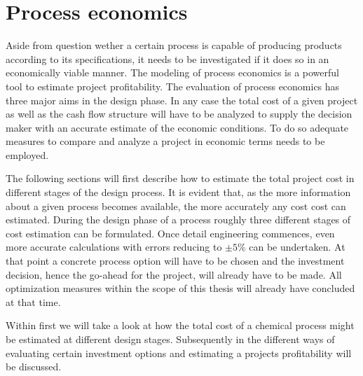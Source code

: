 \chapter{Process economics}
\label{chp:ProcesEconomics}

Aside from question wether a certain process is capable of producing products according to its
specifications, it needs to be investigated if it does so in an economically viable manner. The modeling
of process economics is a powerful tool to estimate project profitability. The evaluation of process
economics has three major aims in the design phase.
%
In any case the total cost of a given project as well as the cash flow structure will have to be analyzed to supply
the decision maker with an accurate estimate of the economic conditions. To do so adequate measures to compare and
analyze a project in economic terms needs to be employed.

The following sections will first describe how to estimate the total project cost in different stages of the
design process. It is evident that, as the more information about a given process becomes available, the
more accurately any cost cost can estimated. During the design phase of a process roughly three
different stages of cost estimation can be formulated.
Once detail engineering commences, even more accurate calculations with errors reducing to $\pm 5\%$
can be undertaken\cite{Peters.2003}. At that point a concrete process option will have to be chosen and
the investment decision, hence the go-ahead for the project,  will already have to be made. All optimization
measures within the scope of this thesis will already have concluded at that time.

Within  first we will take a look at how the total cost of a chemical process might be
estimated at different design stages. Subsequently in  the different ways
of evaluating certain investment options and estimating a projects profitability will be discussed.


